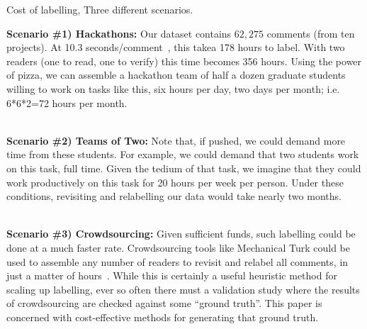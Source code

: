 \documentclass[10pt,conference]{IEEEtran}
\begin{document}
 
 
\begin{table}[!t]
 \caption{Cost of labelling, Three different scenarios.}\label{tbl:costs}
\small
\begin{mdframed}[backgroundcolor=blue!5]

{\bf Scenario \#1) Hackathons:}
Our dataset contains $62,275$ comments (from ten projects). At 10.3 seconds/comment~\cite{maldonado2015detecting},
this   takea 178 hours to label.
With two readers (one to read, one to verify)  this time becomes 356 hours.
Using the power of pizza, we can assemble a hackathon team of half a dozen graduate students willing to work on tasks
like this, six hours per day, two days per month; i.e. 6*6*2=72 hours per month. 

~\\

{\bf Scenario \#2) Teams of Two:}
Note that, if pushed, we could demand more
time from these students. For example, we could demand that two students work on this task, full time.
Given the tedium of that task, we imagine that they could work productively on this task for 20 hours per week per person.
Under these conditions, revisiting and relabelling our data would take nearly two months.

~\\

{\bf Scenario \#3) Crowdsourcing:}
 Given sufficient funds, such labelling could be done at a much faster rate.
 Crowdsourcing tools like Mechanical Turk could be used to assemble any number of readers
 to revisit and relabel all comments, in just a matter of hours~\cite{chen19icpc,wang19ist,wang19tse}. While this is certainly a useful heuristic method for scaling up labelling, ever so often there must a validation study
 where the results of crowdsourcing are checked against some ``ground truth''.
 This paper is concerned with cost-effective methods for generating that ground truth.
 \end{mdframed}

 \end{table}
\end{document}

